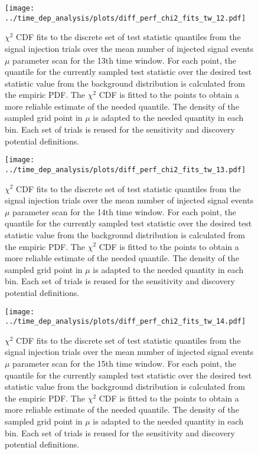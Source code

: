 \begin{figure}[H]
  \centering
  \texttt{[image: ../time\_dep\_analysis/plots/diff\_perf\_chi2\_fits\_tw\_12.pdf]}
  \caption[$\chi^2$ CDF fits for the 13th time window differential performance]{
     $\chi^2$ CDF fits to the discrete set of test statistic quantiles from the signal injection trials over the mean number of injected signal events $\mu$ parameter scan for the 13th time window.
     For each point, the quantile for the currently sampled test statistic over the desired test statistic value from the background distribution is calculated from the empiric PDF.
     The $\chi^2$ CDF is fitted to the points to obtain a more reliable estimate of the needed quantile.
     The density of the sampled grid point in $\mu$ is adapted to the needed quantity in each bin.
     Each set of trials is reused for the sensitivity and discovery potential definitions.
  }
  \label{fig:diff_perf_chi2_fits_tw_12}
\end{figure}
\begin{figure}[H]
  \centering
  \texttt{[image: ../time\_dep\_analysis/plots/diff\_perf\_chi2\_fits\_tw\_13.pdf]}
  \caption[$\chi^2$ CDF fits for the 14th time window differential performance]{
     $\chi^2$ CDF fits to the discrete set of test statistic quantiles from the signal injection trials over the mean number of injected signal events $\mu$ parameter scan for the 14th time window.
     For each point, the quantile for the currently sampled test statistic over the desired test statistic value from the background distribution is calculated from the empiric PDF.
     The $\chi^2$ CDF is fitted to the points to obtain a more reliable estimate of the needed quantile.
     The density of the sampled grid point in $\mu$ is adapted to the needed quantity in each bin.
     Each set of trials is reused for the sensitivity and discovery potential definitions.
  }
  \label{fig:diff_perf_chi2_fits_tw_13}
\end{figure}
\begin{figure}[H]
  \centering
  \texttt{[image: ../time\_dep\_analysis/plots/diff\_perf\_chi2\_fits\_tw\_14.pdf]}
  \caption[$\chi^2$ CDF fits for the 15th time window differential performance]{
     $\chi^2$ CDF fits to the discrete set of test statistic quantiles from the signal injection trials over the mean number of injected signal events $\mu$ parameter scan for the 15th time window.
     For each point, the quantile for the currently sampled test statistic over the desired test statistic value from the background distribution is calculated from the empiric PDF.
     The $\chi^2$ CDF is fitted to the points to obtain a more reliable estimate of the needed quantile.
     The density of the sampled grid point in $\mu$ is adapted to the needed quantity in each bin.
     Each set of trials is reused for the sensitivity and discovery potential definitions.
  }
  \label{fig:diff_perf_chi2_fits_tw_14}
\end{figure}
